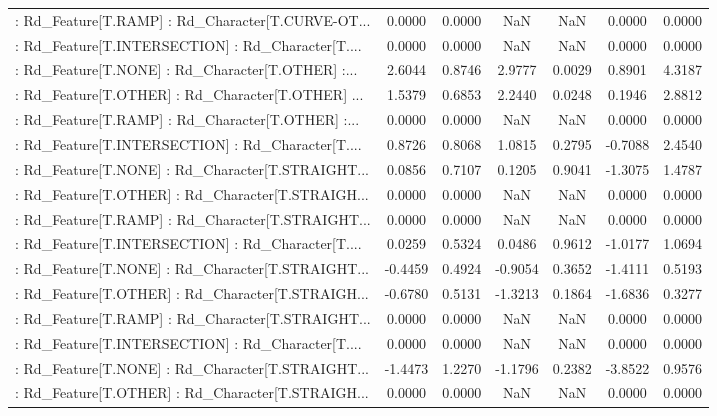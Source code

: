 \begin{longtable}{p{4cm}cccccc}
 : Rd\_Feature[T.RAMP] : Rd\_Character[T.CURVE-OT... &  0.0000 &    0.0000 &     NaN &          NaN &  0.0000 &  0.0000 \\
 : Rd\_Feature[T.INTERSECTION] : Rd\_Character[T.... &  0.0000 &    0.0000 &     NaN &          NaN &  0.0000 &  0.0000 \\
 : Rd\_Feature[T.NONE] : Rd\_Character[T.OTHER] :... &  2.6044 &    0.8746 &  2.9777 &       0.0029 &  0.8901 &  4.3187 \\
 : Rd\_Feature[T.OTHER] : Rd\_Character[T.OTHER] ... &  1.5379 &    0.6853 &  2.2440 &       0.0248 &  0.1946 &  2.8812 \\
 : Rd\_Feature[T.RAMP] : Rd\_Character[T.OTHER] :... &  0.0000 &    0.0000 &     NaN &          NaN &  0.0000 &  0.0000 \\
 : Rd\_Feature[T.INTERSECTION] : Rd\_Character[T.... &  0.8726 &    0.8068 &  1.0815 &       0.2795 & -0.7088 &  2.4540 \\
 : Rd\_Feature[T.NONE] : Rd\_Character[T.STRAIGHT... &  0.0856 &    0.7107 &  0.1205 &       0.9041 & -1.3075 &  1.4787 \\
 : Rd\_Feature[T.OTHER] : Rd\_Character[T.STRAIGH... &  0.0000 &    0.0000 &     NaN &          NaN &  0.0000 &  0.0000 \\
 : Rd\_Feature[T.RAMP] : Rd\_Character[T.STRAIGHT... &  0.0000 &    0.0000 &     NaN &          NaN &  0.0000 &  0.0000 \\
 : Rd\_Feature[T.INTERSECTION] : Rd\_Character[T.... &  0.0259 &    0.5324 &  0.0486 &       0.9612 & -1.0177 &  1.0694 \\
 : Rd\_Feature[T.NONE] : Rd\_Character[T.STRAIGHT... & -0.4459 &    0.4924 & -0.9054 &       0.3652 & -1.4111 &  0.5193 \\
 : Rd\_Feature[T.OTHER] : Rd\_Character[T.STRAIGH... & -0.6780 &    0.5131 & -1.3213 &       0.1864 & -1.6836 &  0.3277 \\
 : Rd\_Feature[T.RAMP] : Rd\_Character[T.STRAIGHT... &  0.0000 &    0.0000 &     NaN &          NaN &  0.0000 &  0.0000 \\
 : Rd\_Feature[T.INTERSECTION] : Rd\_Character[T.... &  0.0000 &    0.0000 &     NaN &          NaN &  0.0000 &  0.0000 \\
 : Rd\_Feature[T.NONE] : Rd\_Character[T.STRAIGHT... & -1.4473 &    1.2270 & -1.1796 &       0.2382 & -3.8522 &  0.9576 \\
 : Rd\_Feature[T.OTHER] : Rd\_Character[T.STRAIGH... &  0.0000 &    0.0000 &     NaN &          NaN &  0.0000 &  0.0000 \\

\end{longtable}
